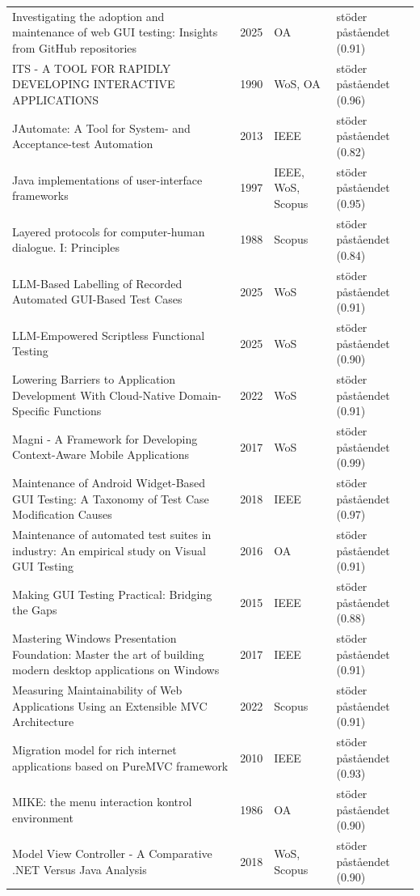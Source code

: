 \begin{longtable}{@{}%
  >{\raggedright\arraybackslash}p{}c%
  >{\raggedright\arraybackslash}p{}%
  >{\raggedright\arraybackslash}p{}@{}}
Investigating the adoption and maintenance of web GUI testing: Insights from GitHub repositories & 2025 & OA & stöder påståendet (0.91) \\
ITS - A TOOL FOR RAPIDLY DEVELOPING INTERACTIVE APPLICATIONS & 1990 & WoS, OA & stöder påståendet (0.96) \\
JAutomate: A Tool for System- and Acceptance-test Automation & 2013 & IEEE & stöder påståendet (0.82) \\
Java implementations of user-interface frameworks & 1997 & IEEE, WoS, Scopus & stöder påståendet (0.95) \\
Layered protocols for computer-human dialogue. I: Principles & 1988 & Scopus & stöder påståendet (0.84) \\
LLM-Based Labelling of Recorded Automated GUI-Based Test Cases & 2025 & WoS & stöder påståendet (0.91) \\
LLM-Empowered Scriptless Functional Testing & 2025 & WoS & stöder påståendet (0.90) \\
Lowering Barriers to Application Development With Cloud-Native Domain-Specific Functions & 2022 & WoS & stöder påståendet (0.91) \\
Magni - A Framework for Developing Context-Aware Mobile Applications & 2017 & WoS & stöder påståendet (0.99) \\
Maintenance of Android Widget-Based GUI Testing: A Taxonomy of Test Case Modification Causes & 2018 & IEEE & stöder påståendet (0.97) \\
Maintenance of automated test suites in industry: An empirical study on Visual GUI Testing & 2016 & OA & stöder påståendet (0.91) \\
Making GUI Testing Practical: Bridging the Gaps & 2015 & IEEE & stöder påståendet (0.88) \\
Mastering Windows Presentation Foundation: Master the art of building modern desktop applications on Windows & 2017 & IEEE & stöder påståendet (0.91) \\
Measuring Maintainability of Web Applications Using an Extensible MVC Architecture & 2022 & Scopus & stöder påståendet (0.91) \\
Migration model for rich internet applications based on PureMVC framework & 2010 & IEEE & stöder påståendet (0.93) \\
MIKE: the menu interaction kontrol environment & 1986 & OA & stöder påståendet (0.90) \\
Model View Controller - A Comparative .NET Versus Java Analysis & 2018 & WoS, Scopus & stöder påståendet (0.90) \\

\end{longtable}
